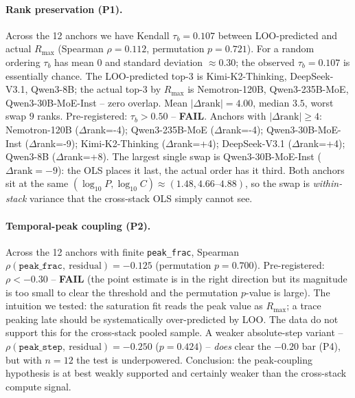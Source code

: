 \documentclass{article}
\begin{document}
\paragraph{Rank preservation (P1).}
Across the 12 anchors we have Kendall $\tau_b=0.107$ between LOO-predicted and
actual $R_{\max}$ (Spearman $\rho=0.112$, permutation $p=0.721$). For a random
ordering $\tau_b$ has mean $0$ and standard deviation $\approx 0.30$; the
observed $\tau_b=0.107$ is essentially chance. The LOO-predicted top-3 is
{Kimi-K2-Thinking, DeepSeek-V3.1, Qwen3-8B}; the actual top-3 by $R_{\max}$ is {Nemotron-120B, Qwen3-235B-MoE, Qwen3-30B-MoE-Inst} -- zero overlap. Mean
$\lvert\Delta\text{rank}\rvert=4.00$, median $3.5$, worst swap $9$
ranks. Pre-registered: $\tau_b > 0.50$ -- \textbf{FAIL}. Anchors with
$\lvert\Delta\text{rank}\rvert \geq 4$: Nemotron-120B ($\Delta$rank=-4); Qwen3-235B-MoE ($\Delta$rank=-4); Qwen3-30B-MoE-Inst ($\Delta$rank=-9); Kimi-K2-Thinking ($\Delta$rank=+4); DeepSeek-V3.1 ($\Delta$rank=+4); Qwen3-8B ($\Delta$rank=+8). The largest single swap is
Qwen3-30B-MoE-Inst ($\Delta\text{rank}=-9$): the OLS places it last, the
actual order has it third. Both anchors sit at the same
$(\log_{10} P, \log_{10} C)\approx(1.48, 4.66\text{--}4.88)$, so the swap is
\emph{within-stack} variance that the cross-stack OLS simply cannot see.

\paragraph{Temporal-peak coupling (P2).}
\label{par:peak-coupling}
Across the 12 anchors with finite \texttt{peak\_frac}, Spearman
$\rho(\texttt{peak\_frac},\ \mathrm{residual})=-0.125$ (permutation $p=0.700$).
Pre-registered: $\rho < -0.30$ -- \textbf{FAIL} (the point estimate is in
the right direction but its magnitude is too small to clear the threshold
and the permutation $p$-value is large). The intuition we tested: the
saturation fit reads the peak value as $R_{\max}$; a trace peaking late
should be systematically over-predicted by LOO. The data do not support
this for the cross-stack pooled sample. A weaker absolute-step variant
-- $\rho(\texttt{peak\_step},\ \mathrm{residual})=-0.250$ ($p=0.424$) --
\emph{does} clear the $-0.20$ bar (P4), but with $n=12$ the test is
underpowered. Conclusion: the peak-coupling hypothesis is at best weakly
supported and certainly weaker than the cross-stack compute signal.
\end{document}
